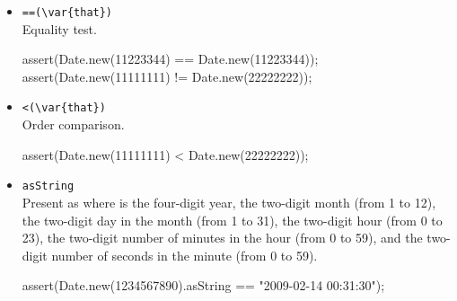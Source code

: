 \begin{itemize}
\item \lstinline|==(\var{that})|\\
  Equality test.
\begin{urbiscript}[firstnumber=last]
assert(Date.new(11223344) == Date.new(11223344));
assert(Date.new(11111111) != Date.new(22222222));
\end{urbiscript}

\item \lstinline|<(\var{that})|\\
  Order comparison.
\begin{urbiscript}[firstnumber=last]
assert(Date.new(11111111) < Date.new(22222222));
\end{urbiscript}

\item \lstinline|asString|\\
  Present as  where  is the four-digit
  year,  the two-digit month (from 1 to 12),  the
  two-digit day in the month (from 1 to 31),  the two-digit
  hour (from 0 to 23),  the two-digit number of minutes in the
  hour (from 0 to 59), and  the two-digit number of seconds in
  the minute (from 0 to 59).
\begin{urbiscript}[firstnumber=last]
assert(Date.new(1234567890).asString == "2009-02-14 00:31:30");
\end{urbiscript}

\end{itemize}


